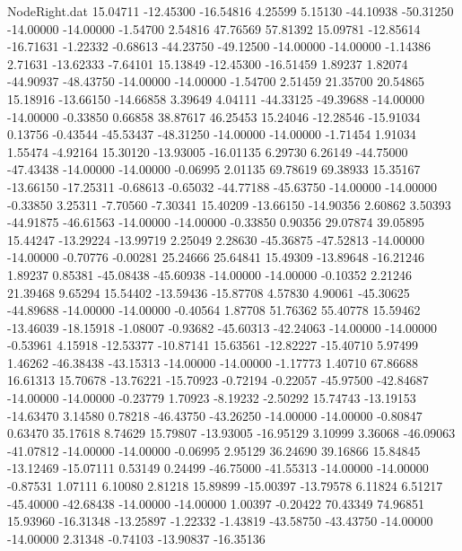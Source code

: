 \begin{filecontents}{NodeRight.dat}
  15.04711  -12.45300  -16.54816     4.25599    5.15130  -44.10938  -50.31250  -14.00000  -14.00000   -1.54700    2.54816   47.76569   57.81392
  15.09781  -12.85614  -16.71631    -1.22332   -0.68613  -44.23750  -49.12500  -14.00000  -14.00000   -1.14386    2.71631  -13.62333   -7.64101
  15.13849  -12.45300  -16.51459     1.89237    1.82074  -44.90937  -48.43750  -14.00000  -14.00000   -1.54700    2.51459   21.35700   20.54865
  15.18916  -13.66150  -14.66858     3.39649    4.04111  -44.33125  -49.39688  -14.00000  -14.00000   -0.33850    0.66858   38.87617   46.25453
  15.24046  -12.28546  -15.91034     0.13756   -0.43544  -45.53437  -48.31250  -14.00000  -14.00000   -1.71454    1.91034    1.55474   -4.92164
  15.30120  -13.93005  -16.01135     6.29730    6.26149  -44.75000  -47.43438  -14.00000  -14.00000   -0.06995    2.01135   69.78619   69.38933
  15.35167  -13.66150  -17.25311    -0.68613   -0.65032  -44.77188  -45.63750  -14.00000  -14.00000   -0.33850    3.25311   -7.70560   -7.30341
  15.40209  -13.66150  -14.90356     2.60862    3.50393  -44.91875  -46.61563  -14.00000  -14.00000   -0.33850    0.90356   29.07874   39.05895
  15.44247  -13.29224  -13.99719     2.25049    2.28630  -45.36875  -47.52813  -14.00000  -14.00000   -0.70776   -0.00281   25.24666   25.64841
  15.49309  -13.89648  -16.21246     1.89237    0.85381  -45.08438  -45.60938  -14.00000  -14.00000   -0.10352    2.21246   21.39468    9.65294
  15.54402  -13.59436  -15.87708     4.57830    4.90061  -45.30625  -44.89688  -14.00000  -14.00000   -0.40564    1.87708   51.76362   55.40778
  15.59462  -13.46039  -18.15918    -1.08007   -0.93682  -45.60313  -42.24063  -14.00000  -14.00000   -0.53961    4.15918  -12.53377  -10.87141
  15.63561  -12.82227  -15.40710     5.97499    1.46262  -46.38438  -43.15313  -14.00000  -14.00000   -1.17773    1.40710   67.86688   16.61313
  15.70678  -13.76221  -15.70923    -0.72194   -0.22057  -45.97500  -42.84687  -14.00000  -14.00000   -0.23779    1.70923   -8.19232   -2.50292
  15.74743  -13.19153  -14.63470     3.14580    0.78218  -46.43750  -43.26250  -14.00000  -14.00000   -0.80847    0.63470   35.17618    8.74629
  15.79807  -13.93005  -16.95129     3.10999    3.36068  -46.09063  -41.07812  -14.00000  -14.00000   -0.06995    2.95129   36.24690   39.16866
  15.84845  -13.12469  -15.07111     0.53149    0.24499  -46.75000  -41.55313  -14.00000  -14.00000   -0.87531    1.07111    6.10080    2.81218
  15.89899  -15.00397  -13.79578     6.11824    6.51217  -45.40000  -42.68438  -14.00000  -14.00000    1.00397   -0.20422   70.43349   74.96851
  15.93960  -16.31348  -13.25897    -1.22332   -1.43819  -43.58750  -43.43750  -14.00000  -14.00000    2.31348   -0.74103  -13.90837  -16.35136

\end{filecontents}
